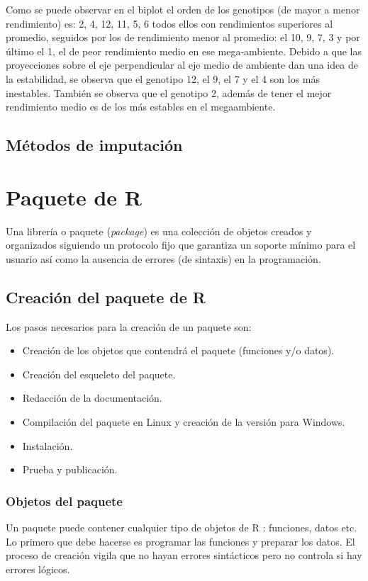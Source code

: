 Como se puede observar en el biplot el orden de los genotipos (de mayor a menor rendimiento) es: 2, 4, 12, 11, 5, 6 todos ellos con rendimientos superiores al promedio, seguidos por los de rendimiento menor al promedio: el 10, 9, 7, 3 y por último el 1, el de peor rendimiento medio en ese mega-ambiente.
Debido a que las proyecciones sobre el eje perpendicular al eje medio de ambiente dan una idea de la estabilidad, se observa que el genotipo 12, el 9, el 7 y el 4 son los más inestables. También se observa que el genotipo 2, además de tener el mejor rendimiento medio es de los más estables en el megaambiente.


\subsection{Métodos de imputación}




\section{Paquete de R}

Una librería o paquete (\emph{package}) es una colección de objetos creados y organizados siguiendo un protocolo fijo que garantiza un soporte mínimo para el usuario así como la ausencia de errores (de sintaxis) en la programación.

\subsection{Creación del paquete de R}
Los pasos necesarios para la creación de un paquete son:
\begin{itemize}
\item Creación de los objetos que contendrá el paquete (funciones y/o
datos).
\item Creación del esqueleto del paquete.
\item Redacción de la documentación.
\item Compilación del paquete en Linux y creación de la versión para Windows.
\item Instalación.
\item Prueba y publicación.
\end{itemize}

\subsubsection{Objetos del paquete}
Un paquete puede contener cualquier tipo de objetos de R : funciones, datos etc. Lo primero que debe hacerse es programar las funciones y preparar los datos. El proceso de creación vigila que no hayan errores sintácticos pero no controla si hay errores lógicos.
 

